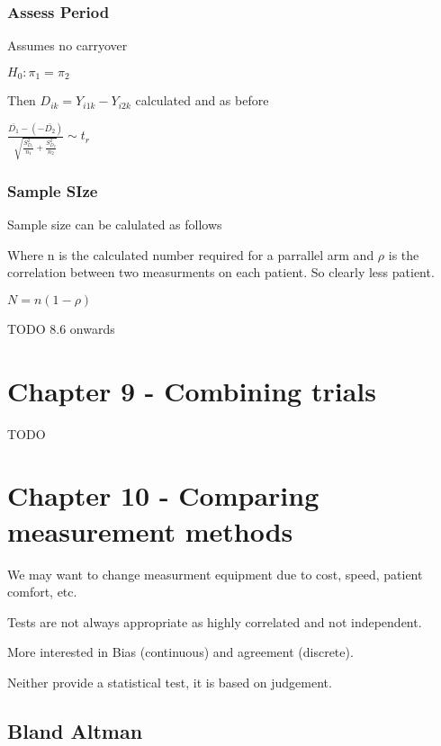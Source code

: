\documentclass[
  letterpaper,
  DIV=11,
  numbers=noendperiod]{scrreprt}
\begin{document}
\hypertarget{assess-period}{%
\subsubsection{Assess Period}\label{assess-period}}

Assumes no carryover

\(H_0 : \pi_1 = \pi_2\)

Then \(D_{ik} = Y_{i1k} - Y_{i2k}\) calculated and as before

\(\frac{\bar{D_1} - (-\bar{D_2})} {\sqrt{  \frac{S^2_{D_1}}{n_1} +  \frac{S^2_{D_2}}{n_2} }} \sim t_r\)

\hypertarget{sample-size}{%
\subsubsection{Sample SIze}\label{sample-size}}

Sample size can be calulated as follows

Where n is the calculated number required for a parrallel arm and
\(\rho\) is the correlation between two measurments on each patient. So
clearly less patient.

\(N = n(1-\rho)\)

TODO 8.6 onwards

\hypertarget{chapter-9---combining-trials}{%
\section{Chapter 9 - Combining
trials}\label{chapter-9---combining-trials}}

TODO

\hypertarget{chapter-10---comparing-measurement-methods}{%
\section{Chapter 10 - Comparing measurement
methods}\label{chapter-10---comparing-measurement-methods}}

We may want to change measurment equipment due to cost, speed, patient
comfort, etc.

Tests are not always appropriate as highly correlated and not
independent.

More interested in Bias (continuous) and agreement (discrete).

Neither provide a statistical test, it is based on judgement.

\hypertarget{bland-altman}{%
\subsection{Bland Altman}\label{bland-altman}}
\end{document}
